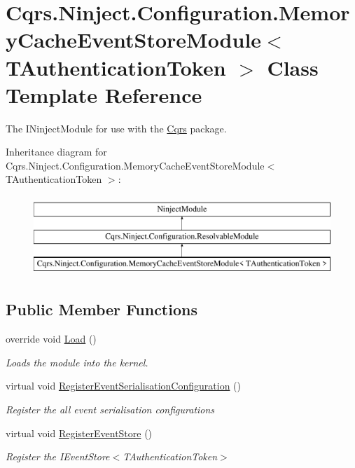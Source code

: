\hypertarget{classCqrs_1_1Ninject_1_1Configuration_1_1MemoryCacheEventStoreModule}{}\section{Cqrs.\+Ninject.\+Configuration.\+Memory\+Cache\+Event\+Store\+Module$<$ T\+Authentication\+Token $>$ Class Template Reference}
\label{classCqrs_1_1Ninject_1_1Configuration_1_1MemoryCacheEventStoreModule}


The I\+Ninject\+Module for use with the \hyperlink{namespaceCqrs}{Cqrs} package.  


Inheritance diagram for Cqrs.\+Ninject.\+Configuration.\+Memory\+Cache\+Event\+Store\+Module$<$ T\+Authentication\+Token $>$\+:\begin{figure}[H]
\begin{center}
\leavevmode
\includegraphics[height=3.000000cm]{classCqrs_1_1Ninject_1_1Configuration_1_1MemoryCacheEventStoreModule}
\end{center}
\end{figure}
\subsection*{Public Member Functions}
\begin{DoxyCompactItemize}
\item 
override void \hyperlink{classCqrs_1_1Ninject_1_1Configuration_1_1MemoryCacheEventStoreModule_a351093c6c6f864c24970b106939fad20_a351093c6c6f864c24970b106939fad20}{Load} ()
\begin{DoxyCompactList}\small\item\em Loads the module into the kernel. \end{DoxyCompactList}\item 
virtual void \hyperlink{classCqrs_1_1Ninject_1_1Configuration_1_1MemoryCacheEventStoreModule_a0872590a8f8738e6f11a9d39274ff691_a0872590a8f8738e6f11a9d39274ff691}{Register\+Event\+Serialisation\+Configuration} ()
\begin{DoxyCompactList}\small\item\em Register the all event serialisation configurations \end{DoxyCompactList}\item 
virtual void \hyperlink{classCqrs_1_1Ninject_1_1Configuration_1_1MemoryCacheEventStoreModule_a085e95adbb290708cb8912c82605782c_a085e95adbb290708cb8912c82605782c}{Register\+Event\+Store} ()
\begin{DoxyCompactList}\small\item\em Register the I\+Event\+Store$<$\+T\+Authentication\+Token$>$ \end{DoxyCompactList}\end{DoxyCompactItemize}
